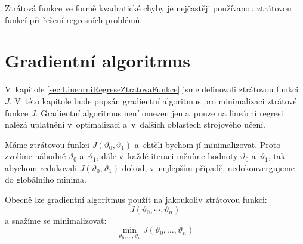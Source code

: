 \par{Ztrátová funkce ve formě kvadratické chyby je nejčastěji používanou ztrátovou funkcí při řešení regresních problémů.}

\newpage









\section{Gradientní algoritmus}
\label{sec:LinearniRegreseGradientDescent}

\par{V~kapitole \ref{sec:LinearniRegreseZtratovaFunkce} jsme definovali ztrátovou funkci $J$. V~této kapitole bude popsán gradientní algoritmus pro minimalizaci ztrátové funkce $J$. Gradientní algoritmus není omezen jen a~pouze na lineární regresi nalézá uplatnění v~optimalizaci a~v~dalších oblastech strojového učení.} 

\par{Máme ztrátovou funkci $J \left( \vartheta_0, \vartheta_1 \right)$ a~chtěli bychom jí minimalizovat. Proto zvolíme náhodně $\vartheta_0$ a~$\vartheta_1$, dále v~každé iteraci měníme hodnoty $\vartheta_0$ a~$\vartheta_1$, tak abychom redukovali $J \left( \vartheta_0, \vartheta_1 \right)$ dokud, v~nejlepším případě, nedokonvergujeme do globálního minima.}

\par{Obecně lze gradientní algoritmus použít na jakoukoliv ztrátovou funkci:
\begin{equation}
	J \left( \vartheta_0, \cdots, \vartheta_n \right)
\end{equation}
a snažíme se minimalizovat:
\begin{equation}
	\min_{\vartheta_0, \ldots, \vartheta_n} J \left( \vartheta_0, \ldots, \vartheta_n \right)
\end{equation}}

